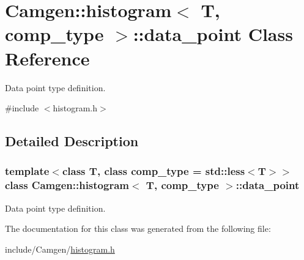 \hypertarget{a00114}{}\section{Camgen\+:\+:histogram$<$ T, comp\+\_\+type $>$\+:\+:data\+\_\+point Class Reference}
\label{a00114}


Data point type definition.  




{\ttfamily \#include $<$histogram.\+h$>$}



\subsection{Detailed Description}
\subsubsection*{template$<$class T, class comp\+\_\+type = std\+::less$<$\+T$>$$>$class Camgen\+::histogram$<$ T, comp\+\_\+type $>$\+::data\+\_\+point}

Data point type definition. 

The documentation for this class was generated from the following file\+:\begin{DoxyCompactItemize}
\item 
include/\+Camgen/\hyperlink{a00665}{histogram.\+h}\end{DoxyCompactItemize}
